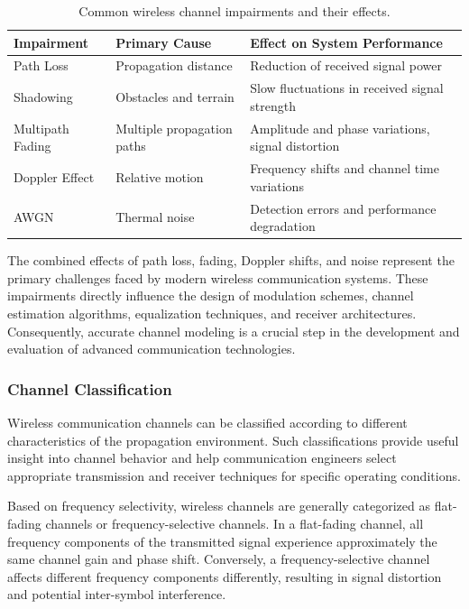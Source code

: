 \begin{table}[H]
\centering
\caption{Common wireless channel impairments and their effects.}
\label{tab:channel_impairments}

\begin{tabular}{|p{3cm}|p{4cm}|p{6cm}|}
\hline
\textbf{Impairment} &
\textbf{Primary Cause} &
\textbf{Effect on System Performance} \\
\hline

Path Loss &
Propagation distance &
Reduction of received signal power \\
\hline

Shadowing &
Obstacles and terrain &
Slow fluctuations in received signal strength \\
\hline

Multipath Fading &
Multiple propagation paths &
Amplitude and phase variations, signal distortion \\
\hline

Doppler Effect &
Relative motion &
Frequency shifts and channel time variations \\
\hline

AWGN &
Thermal noise &
Detection errors and performance degradation \\
\hline

\end{tabular}

\end{table}

The combined effects of path loss, fading, Doppler shifts, and noise represent the primary challenges faced by modern wireless communication systems. These impairments directly influence the design of modulation schemes, channel estimation algorithms, equalization techniques, and receiver architectures. Consequently, accurate channel modeling is a crucial step in the development and evaluation of advanced communication technologies.


\subsubsection{Channel Classification}

Wireless communication channels can be classified according to different characteristics of the propagation environment. Such classifications provide useful insight into channel behavior and help communication engineers select appropriate transmission and receiver techniques for specific operating conditions.

Based on frequency selectivity, wireless channels are generally categorized as flat-fading channels or frequency-selective channels. In a flat-fading channel, all frequency components of the transmitted signal experience approximately the same channel gain and phase shift. Conversely, a frequency-selective channel affects different frequency components differently, resulting in signal distortion and potential inter-symbol interference.

